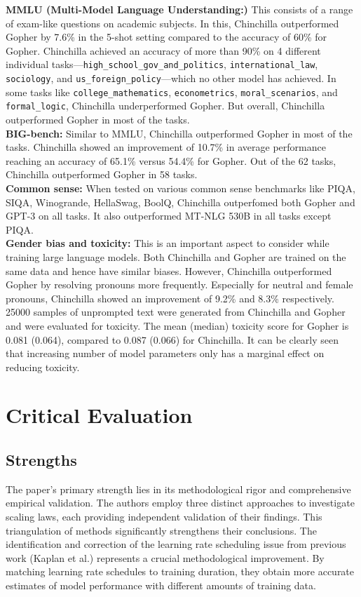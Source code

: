 \documentclass{article}
\begin{document}
\noindent \textbf{MMLU (Multi-Model Language Understanding:)} This consists of a range of exam-like questions on academic subjects. In this, Chinchilla outperformed Gopher by 7.6\% in the 5-shot setting compared to the accuracy of 60\% for Gopher. Chinchilla achieved an accuracy of more than 90\% on 4 different individual tasks—\texttt{high\_school\_gov\_and\_politics}, \texttt{international\_law}, \texttt{sociology}, and \texttt{us\_foreign\_policy}—which no other model has achieved.
In some tasks like \texttt{college\_mathematics}, \texttt{econometrics}, \texttt{moral\_scenarios}, and \texttt{formal\_logic}, Chinchilla underperformed Gopher. But overall, Chinchilla outperformed Gopher in most of the tasks. \\

\noindent \textbf{BIG-bench:} Similar to MMLU, Chinchilla outperformed Gopher in most of the tasks. Chinchilla showed an improvement of 10.7\% in average performance reaching an accuracy of 65.1\% versus 54.4\% for Gopher. Out of the 62 tasks, Chinchilla outperformed Gopher in 58 tasks. \\

\noindent \textbf{Common sense: }When tested on various common sense benchmarks like PIQA, SIQA, Winogrande, HellaSwag, BoolQ, Chinchilla outperfomed both Gopher and GPT-3 on all tasks. It also outperformed MT-NLG 530B in all tasks except PIQA. \\

\noindent \textbf{Gender bias and toxicity: } This is an important aspect to consider while training large language models. Both Chinchilla and Gopher are trained on the same data and hence have similar biases. However, Chinchilla outperformed Gopher by resolving pronouns more frequently. Especially for neutral and female pronouns, Chinchilla showed an improvement of 9.2\% and 8.3\% respectively.
25000 samples of unprompted text were generated from Chinchilla and Gopher and were evaluated for toxicity. The mean (median) toxicity score for Gopher is 0.081 (0.064), compared to 0.087 (0.066) for Chinchilla. It can be clearly seen that increasing number of model parameters only has a marginal effect on reducing toxicity.


\section{Critical Evaluation}

\subsection{Strengths}
The paper's primary strength lies in its methodological rigor and comprehensive empirical validation. The authors employ three distinct approaches to investigate scaling laws, each providing independent validation of their findings. This triangulation of methods significantly strengthens their conclusions. The identification and correction of the learning rate scheduling issue from previous work (Kaplan et al.) represents a crucial methodological improvement. By matching learning rate schedules to training duration, they obtain more accurate estimates of model performance with different amounts of training data.
\end{document}
